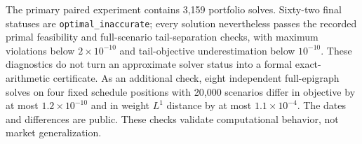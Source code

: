 The primary paired experiment contains 3,159 portfolio solves. Sixty-two final statuses are \texttt{optimal\_inaccurate}; every solution nevertheless passes the recorded primal feasibility and full-scenario tail-separation checks, with maximum violations below $2\times10^{-10}$ and tail-objective underestimation below $10^{-10}$. These diagnostics do not turn an approximate solver status into a formal exact-arithmetic certificate. As an additional check, eight independent full-epigraph solves on four fixed schedule positions with 20,000 scenarios differ in objective by at most $1.2\times10^{-10}$ and in weight $L^1$ distance by at most $1.1\times10^{-4}$. The dates and differences are public. These checks validate computational behavior, not market generalization.

